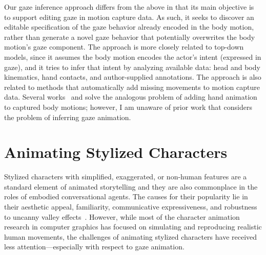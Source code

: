 Our gaze inference approach differs from the above in that its main objective is to support editing gaze in motion capture data. As such, it seeks to discover an editable specification of the gaze behavior already encoded in the body motion, rather than generate a novel gaze behavior that potentially overwrites the body motion's gaze component. The approach is more closely related to top-down models, since it assumes the body motion encodes the actor's intent (expressed in gaze), and it tries to infer that intent by analyzing available data: head and body kinematics, hand contacts, and author-supplied annotations.
The approach is also related to methods that automatically add missing movements to motion capture data. Several works~\citep{jorg2012finger} and \citep{ye2012hand} solve the analogous problem of adding hand animation to captured body motions; however, I am unaware of prior work that considers the problem of inferring gaze animation.

\section{Animating Stylized Characters}
\label{sec:AnimatingStylizedCharacters}

Stylized characters with simplified, exaggerated, or non-human features are a standard element of animated storytelling and they are also commonplace in the roles of embodied conversational agents. The causes for their popularity lie in their aesthetic appeal, familiarity, communicative expressiveness, and robustness to uncanny valley effects~\citep{mori2012uncanny}. However, while most of the character animation research in computer graphics has focused on simulating and reproducing realistic human movements, the challenges of animating stylized characters have received less attention---especially with respect to gaze animation.

